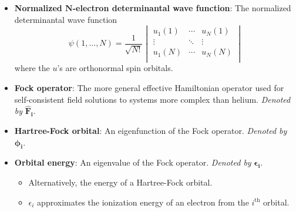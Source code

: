\documentclass[../notes.tex]{subfiles}
\begin{document}
\begin{itemize}
\begin{itemize}
    \end{itemize}
    \item \textbf{Normalized $\bm{N}$-electron determinantal wave function}: The normalized determinantal wave function
    \begin{equation*}
        \psi(1,\dots,N) = \frac{1}{\sqrt{N!}}
        \begin{vmatrix}
            u_1(1) & \cdots & u_N(1)\\
            \vdots & \ddots & \vdots\\
            u_1(N) & \cdots & u_N(N)\\
        \end{vmatrix}
    \end{equation*}
    where the $u$'s are orthonormal spin orbitals.
    \item \textbf{Fock operator}: The more general effective Hamiltonian operator used for self-consistent field solutions to systems more complex than helium. \emph{Denoted by} $\bm{\hat{F}_i}$.
    \item \textbf{Hartree-Fock orbital}: An eigenfunction of the Fock operator. \emph{Denoted by} $\bm{\phi_i}$.
    \item \textbf{Orbital energy}: An eigenvalue of the Fock operator. \emph{Denoted by} $\bm{\epsilon_i}$.
    \begin{itemize}
        \item Alternatively, the energy of a Hartree-Fock orbital.
        \item $\epsilon_i$ approximates the ionization energy of an electron from the $i^\text{th}$ orbital.
    \end{itemize}
\end{itemize}
\end{document}
